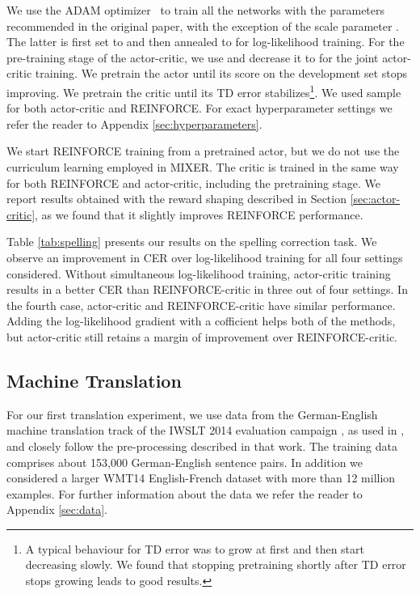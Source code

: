 \documentclass{article} \usepackage{iclr2017_conference,times}
\begin{document}
We use the ADAM optimizer~\citep{kingma2015method} to train all the networks
with the parameters recommended in the original paper, with the exception of
the scale parameter . The latter is first set to  and then
annealed to  for log-likelihood training. For the pre-training
stage of the actor-critic, we use  and decrease it to
 for the joint actor-critic training. We pretrain the actor until
its score on the development set stops improving. We pretrain the critic until
its TD error stabilizes\footnote{A typical behaviour for TD error was to grow
at first and then start decreasing slowly.  We found that stopping pretraining
shortly after TD error stops growing leads to good results.}.  We used 
sample for both actor-critic and REINFORCE. For exact hyperparameter settings
we refer the reader to Appendix \ref{sec:hyperparameters}.

We start REINFORCE training from a pretrained actor, but we do
not use the curriculum learning employed in MIXER. The critic is trained in the
same way for both REINFORCE and actor-critic,
including the pretraining stage.
We report results obtained with the reward shaping described in Section
\ref{sec:actor-critic}, as we
found that it slightly improves REINFORCE performance.

Table \ref{tab:spelling} presents our results on the spelling correction task.
We observe an improvement in CER over log-likelihood training for all four settings considered.
Without simultaneous log-likelihood training,
actor-critic training results in a better CER than REINFORCE-critic 
in three out of four settings.
In the fourth case, actor-critic and REINFORCE-critic have similar
performance. Adding the log-likelihood gradient with a cofficient
 helps both of the methods,
but actor-critic still retains a margin of improvement over REINFORCE-critic.
\subsection{Machine Translation}

For our first translation experiment, we use data from the German-English
machine translation track of the IWSLT 2014 evaluation campaign
\citep{cettolo2014report}, as used in \citet{ranzato2015sequence}, and closely follow the pre-processing described in
that work. The training data comprises about 153,000 German-English
sentence pairs. In addition we considered a larger WMT14 English-French dataset 
\cite{cho2014learning} with more than 12 million examples. For further information
about the data we refer the reader to Appendix \ref{sec:data}.
\end{document}
